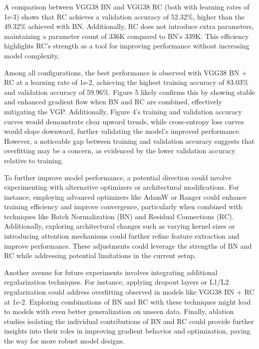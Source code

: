{{A comparison between VGG38 BN and VGG38 RC (both with learning rates of 1e-3) shows that RC achieves a validation accuracy of 52.32\%, higher than the 49.32\% achieved with BN. Additionally, RC does not introduce extra parameters, maintaining a parameter count of 336K compared to BN’s 339K. This efficiency highlights RC’s strength as a tool for improving performance without increasing model complexity.

Among all configurations, the best performance is observed with VGG38 BN + RC at a learning rate of 1e-2, achieving the highest training accuracy of 83.03\% and validation accuracy of 59.96\%. Figure 5 likely confirms this by showing stable and enhanced gradient flow when BN and RC are combined, effectively mitigating the VGP. Additionally, Figure 4’s training and validation accuracy curves would demonstrate clear upward trends, while cross-entropy loss curves would slope downward, further validating the model’s improved performance. However, a noticeable gap between training and validation accuracy suggests that overfitting may be a concern, as evidenced by the lower validation accuracy relative to training.

To further improve model performance, a potential direction could involve experimenting with alternative optimizers or architectural modifications. For instance, employing advanced optimizers like AdamW or Ranger could enhance training efficiency and improve convergence, particularly when combined with techniques like Batch Normalization (BN) and Residual Connections (RC). Additionally, exploring architectural changes such as varying kernel sizes or introducing attention mechanisms could further refine feature extraction and improve performance. These adjustments could leverage the strengths of BN and RC while addressing potential limitations in the current setup.

Another avenue for future experiments involves integrating additional regularization techniques. For instance, applying dropout layers or L1/L2 regularization could address overfitting observed in models like VGG38 BN + RC at 1e-2. Exploring combinations of BN and RC with these techniques might lead to models with even better generalization on unseen data. Finally, ablation studies isolating the individual contributions of BN and RC could provide further insights into their roles in improving gradient behavior and optimization, paving the way for more robust model designs.

}
}



